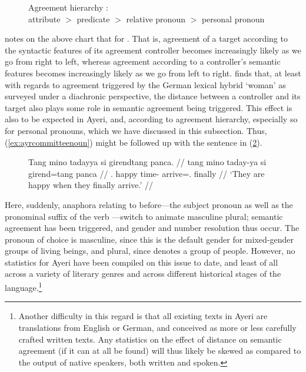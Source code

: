 \begin{figure}
\ex\label{ex:agrhier}%
	Agreement hierarchy \citep[206\psqq]{corbett2006}:\medskip\\
	attribute $>$ predicate $>$ relative pronoun $>$ personal pronoun
\xe
\end{figure}

\citet{corbett2006} notes on the above chart that for . That is, agreement of a target according to the
syntactic features of its agreement controller becomes increasingly likely
as we go from right to left, whereas agreement according to a controller's
semantic features becomes increasingly likely as we go from left to right.
\citet{fleischer2012} finds that, at least with regards to agreement
triggered by the German lexical hybrid  `woman' as surveyed under a
diachronic perspective, the distance between a controller and its target
also plays some role in semantic agreement being triggered. This effect is also
to be expected in Ayeri, and, according to  agreement
hierarchy, especially so for personal pronouns, which we have discussed in this
subsection. Thus, (\ref{ex:ayrcommitteenoun}) might be followed up with the
sentence in (\ref{ex:ayrcommitteenoun_2}).

\begin{figure}
\ex\label{ex:ayrcommitteenoun_2}\begingl
	\gla Tang mino tadayya si girendtang panca. //
	\glb tang mino taday-ya si girend=tang panca //
	\glc \TplM{}.\Aarg{} happy time-\Loc{} \Rel{} arrive=\TplM{}.\Aarg{} 
		finally //
	\glft `They are happy when they finally arrive.' //
\endgl\xe
\end{figure}

Here, suddenly, anaphora relating to  before---the
subject pronoun  as well as the pronominal suffix of the
verb ---switch to animate masculine
plural; semantic agreement has been triggered, and gender and number resolution
thus occur. The pronoun of choice is masculine, since this is the default
gender for mixed-gender groups of living beings, and plural, since
 denotes a group of people. However, no statistics for
Ayeri have been compiled on this issue to date, and least of all across a
variety of literary genres and across different historical stages
of the language.\footnote{Another difficulty in this regard is that all
existing texts in Ayeri are translations from English or German, and conceived
as more or less carefully crafted written texts. Any statistics on the effect
of distance on semantic agreement (if it can at all be found) will thus likely
be skewed as compared to the output of native speakers, both written and
spoken.}

